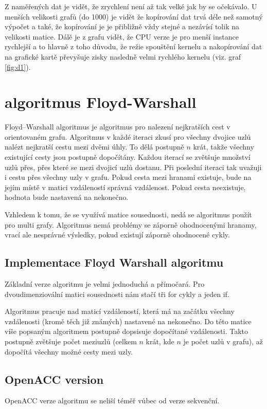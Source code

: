 \documentclass[11pt, fleqn]{article}
\begin{document}
Z naměřených dat je vidět, že zrychlení není až tak velké jak by se očekávalo. U menších velikosti grafů (do 1000) je vidět že kopírování dat trvá déle než samotný výpočet a také, že kopírování je je přibližně vždy stejné a nezávísí tolik na velikosti matice. Dálě je z grafu vidět, že CPU verze je pro menší instance rychlejší a to hlavně z toho důvodu, že režie spouštění kernelu a nakopírování dat na grafické kartě převyšuje zisky nasledně velmi rychlého kernelu (viz. graf \ref{fig:d1}).


\section{algoritmus Floyd-Warshall}

Floyd–Warshall algoritmus je algoritmus pro nalezení nejkratších cest v orientovaném grafu. Algoritmus v každé iteraci zkusí pro všechny dvojice uzlů nalézt nejkratší cestu mezi dvěmi úhly. To dělá postupně $n$ krát, takže všechny existující cesty jsou postupně dopočítány. Každou iterací se zvětšuje množství uzlů přes, přes které se mezi dvojicí uzlů dostanu. Při poslední iteraci tak uvažuji i cestu přes všechny uzly v grafu. Pokud cesta mezi hranami existuje, bude na jejím místě v matici vzdáleností správná vzdálenost. Pokud cesta neexistuje, hodnota bude nastavená na nekonečno.

Vzhledem k tomu, že se využívá matice sousednosti, nedá se algoritmus použít pro multi grafy. Algoritmus nemá problémy se záporně ohodnocenými hranamy, vrací ale nesprávné výsledky, pokud existují záporně ohodnocené cykly.


\subsection{Implementace Floyd Warshall algoritmu}
Základní verze algoritmu je velmi jednoduchá a přímočará. Pro dvoudimenziovální matici sousednosti nám stačí tři for cykly a jeden if.

Algoritmus pracuje nad maticí vzdáleností, která má na začátku všechny vzdálenosti (kromě těch již známých) nastavené na nekonečno. Do této matice víše popsaným algoritmem postupně dopsisuje dopočítané vzdálenosti. Takto postupně zvětšuje počet meziuzlů (celkem $n$ krát, kde $n$ je počet uzlů v grafu), až dopočítá všechny možné cesty mezi uzly.


\subsection{OpenACC version}
OpenACC verze algoritmu se neliší téměř vůbec od verze sekvenční.
\end{document}
